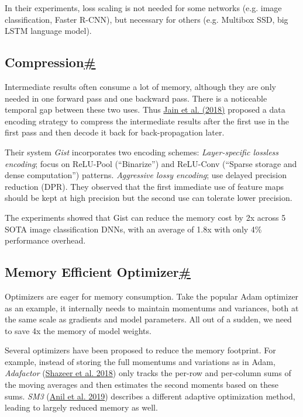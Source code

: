 In their experiments, loss scaling is not needed for some networks (e.g. image classification, Faster R-CNN), but necessary for others (e.g. Multibox SSD, big LSTM language model).

\subsection{\texorpdfstring{Compression\hyperref[compression]{\#}}{Compression\#}}\label{compression}

Intermediate results often consume a lot of memory, although they are only needed in one forward pass and one backward pass. There is a noticeable temporal gap between these two uses. Thus \href{https://www.microsoft.com/en-us/research/uploads/prod/2018/04/fiddle-gist-isca18.pdf}{Jain et al. (2018)} proposed a data encoding strategy to compress the intermediate results after the first use in the first pass and then decode it back for back-propagation later.

Their system \emph{Gist} incorporates two encoding schemes: \emph{Layer-specific lossless encoding}; focus on ReLU-Pool (``Binarize'') and ReLU-Conv (``Sparse storage and dense computation'') patterns. \emph{Aggressive lossy encoding}; use delayed precision reduction (DPR). They observed that the first immediate use of feature maps should be kept at high precision but the second use can tolerate lower precision.

The experiments showed that Gist can reduce the memory cost by 2x across 5 SOTA image classification DNNs, with an average of 1.8x with only 4\% performance overhead.

\subsection{\texorpdfstring{Memory Efficient Optimizer\hyperref[memory-efficient-optimizer]{\#}}{Memory Efficient Optimizer\#}}\label{memory-efficient-optimizer}

Optimizers are eager for memory consumption. Take the popular Adam optimizer as an example, it internally needs to maintain momentums and variances, both at the same scale as gradients and model parameters. All out of a sudden, we need to save 4x the memory of model weights.

Several optimizers have been proposed to reduce the memory footprint. For example, instead of storing the full momentums and variations as in Adam, \emph{Adafactor} (\href{https://arxiv.org/abs/1804.04235}{Shazeer et al. 2018}) only tracks the per-row and per-column sums of the moving averages and then estimates the second moments based on these sums. \emph{SM3} (\href{https://arxiv.org/abs/1901.11150}{Anil et al. 2019}) describes a different adaptive optimization method, leading to largely reduced memory as well.

